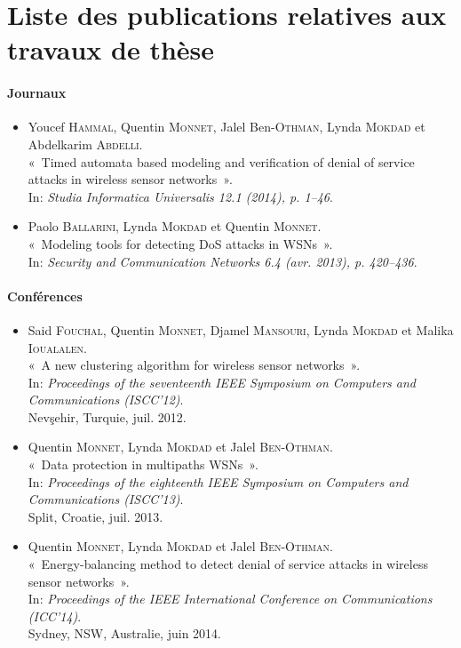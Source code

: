 \section{Liste des publications relatives aux travaux de thèse}


\paragraph{Journaux}
\begin{itemize}
    \item Youcef \textsc{Hammal}, Quentin \textsc{Monnet}, Jalel Ben-\textsc{Othman}, Lynda \textsc{Mokdad} et Abdelkarim \textsc{Abdelli}.\\
    « Timed automata based modeling and verification of denial of service attacks in wireless sensor networks ».\\
    In: \textit{Studia Informatica Universalis 12.1 (2014), p. 1–46}.

    \item Paolo \textsc{Ballarini}, Lynda \textsc{Mokdad} et Quentin \textsc{Monnet}.\\
    « Modeling tools for detecting DoS attacks in WSNs ».\\
    In: \textit{Security and Communication Networks 6.4 (avr. 2013), p. 420–436}.
\end{itemize}

\paragraph{Conférences}
\begin{itemize}
    \item Said \textsc{Fouchal}, Quentin \textsc{Monnet}, Djamel \textsc{Mansouri}, Lynda \textsc{Mokdad} et Malika \textsc{Ioualalen}.\\
    « A new clustering algorithm for wireless sensor networks ».\\
    In: \textit{Proceedings of the seventeenth IEEE Symposium on Computers and Communications (ISCC'12)}.\\
    Nevşehir, Turquie, juil. 2012.

    \item Quentin \textsc{Monnet}, Lynda \textsc{Mokdad} et Jalel \textsc{Ben-Othman}.\\
    « Data protection in multipaths WSNs ».\\
    In: \textit{Proceedings of the eighteenth IEEE Symposium on Computers and Communications (ISCC'13)}.\\
    Split, Croatie, juil. 2013.

    \item Quentin \textsc{Monnet}, Lynda \textsc{Mokdad} et Jalel \textsc{Ben-Othman}.\\
    « Energy-balancing method to detect denial of service attacks in wireless sensor networks ».\\
    In: \textit{Proceedings of the IEEE International Conference on Communications (ICC'14)}.\\
    Sydney, NSW, Australie, juin 2014.
\end{itemize}

